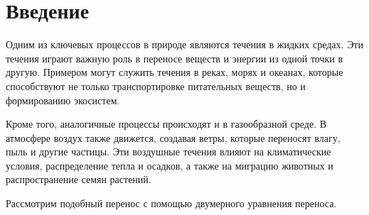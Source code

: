 \section{Введение}
Одним из ключевых процессов в природе являются течения в жидких средах. 
Эти течения играют важную роль в переносе веществ и энергии из одной точки в другую. 
Примером могут служить течения в реках, морях и океанах, 
которые способствуют не только транспортировке питательных веществ, но и формированию экосистем.

Кроме того, аналогичные процессы происходят и в газообразной среде. 
В атмосфере воздух также движется, создавая ветры, которые переносят влагу, пыль и другие частицы. 
Эти воздушные течения влияют на климатические условия, распределение тепла и осадков, 
а также на миграцию животных и распространение семян растений.

Рассмотрим подобный перенос с помощью двумерного уравнения переноса.